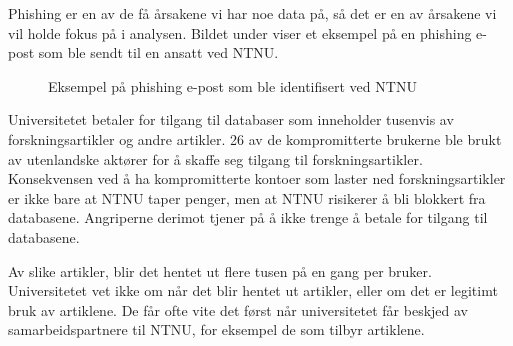 Phishing er en av de få årsakene vi har noe data på, så det er en av årsakene vi vil holde fokus på i analysen. Bildet under viser et eksempel på en phishing e-post som ble sendt til en ansatt ved NTNU.

\begin{figure}[H]%
    \centering
    \qquad
    \qquad
    \caption{Eksempel på phishing e-post som ble identifisert ved NTNU}%
    \label{fig:example}%
\end{figure}


Universitetet betaler for tilgang til databaser som inneholder tusenvis av forskningsartikler og andre artikler. 26 av de kompromitterte brukerne ble brukt av utenlandske aktører for å skaffe seg tilgang til forskningsartikler. Konsekvensen ved å ha kompromitterte kontoer som laster ned forskningsartikler er ikke bare at NTNU taper penger, men at NTNU risikerer å bli blokkert fra databasene. Angriperne derimot tjener på å ikke trenge å betale for tilgang til databasene. 

Av slike artikler, blir det hentet ut flere tusen på en gang per bruker. Universitetet vet ikke om når det blir hentet ut artikler, eller om det er legitimt bruk av artiklene. De får ofte vite det først når universitetet får beskjed av samarbeidspartnere til NTNU, for eksempel de som tilbyr artiklene. 


